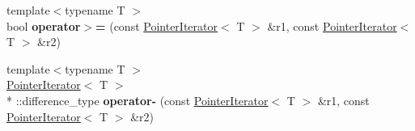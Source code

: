 \begin{DoxyCompactItemize}
\item 
\hypertarget{namespacekeycpp_af6e928cddf953cbdd90b0cd6f3802b24}{{\footnotesize template$<$typename T $>$ }\\bool {\bfseries operator$>$=} (const \hyperlink{classkeycpp_1_1_pointer_iterator}{Pointer\-Iterator}$<$ T $>$ \&r1, const \hyperlink{classkeycpp_1_1_pointer_iterator}{Pointer\-Iterator}$<$ T $>$ \&r2)}\label{namespacekeycpp_af6e928cddf953cbdd90b0cd6f3802b24}

\item 
\hypertarget{namespacekeycpp_ad88546738baf0a658bbe540827343939}{{\footnotesize template$<$typename T $>$ }\\\hyperlink{classkeycpp_1_1_pointer_iterator}{Pointer\-Iterator}$<$ T $>$\\*
\-::difference\-\_\-type {\bfseries operator-\/} (const \hyperlink{classkeycpp_1_1_pointer_iterator}{Pointer\-Iterator}$<$ T $>$ \&r1, const \hyperlink{classkeycpp_1_1_pointer_iterator}{Pointer\-Iterator}$<$ T $>$ \&r2)}\label{namespacekeycpp_ad88546738baf0a658bbe540827343939}

\end{DoxyCompactItemize}


